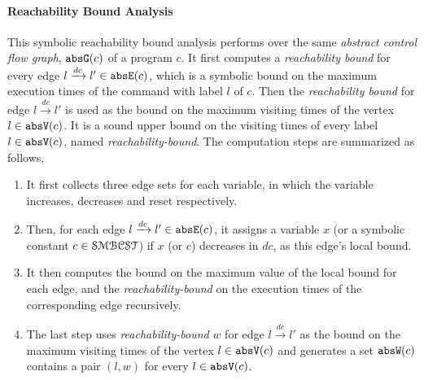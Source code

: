 \paragraph{Reachability Bound Analysis}
This symbolic reachability bound analysis performs over the same \emph{abstract control flow graph}, $\mathtt{abs}{\mathtt{G}}(c)$ of a program $c$. 
It first computes a \emph{reachability bound} for every edge $l \xrightarrow{dc} l' \in \mathtt{abs}{\mathtt{E}}(c)$,
which is a symbolic bound on the maximum execution times of the command with label $l$ of $c$.
Then the \emph{reachability bound} for edge $l \xrightarrow{dc} l'$ is used as the bound on the maximum visiting times of the vertex $l \in \mathtt{abs}{\mathtt{V}}(c)$.
It is a sound upper bound on the visiting times
of every label $l \in \mathtt{abs}{\mathtt{V}}(c)$, named \emph{reachability-bound}.
The computation steps are 
summarized as follows,
\begin{enumerate}
  \item It first collects three edge sets for each variable,
in which the variable increases, decreases and reset respectively.
\item
Then, for each edge  $l \xrightarrow{dc} l' \in \mathtt{abs}{\mathtt{E}}(c)$, it assigns a variable $x$ (or a symbolic constant $c \in \mathcal{SMBCST}$) if $x$ (or $c$) decreases in $dc$, as this edge's local bound.
\item
It then computes the bound on the maximum value of the local bound for each edge,
and the \emph{reachability-bound} on the execution
times of the corresponding edge recursively.
\item The last step uses \emph{reachability-bound} $w$ for edge $l \xrightarrow{dc} l'$ as the bound on the maximum visiting times of the vertex $l \in \mathtt{abs}{\mathtt{V}}(c)$ and generates a set $\mathtt{abs}{\mathtt{W}}(c)$ contains a pair $(l, w)$ for every $l \in \mathtt{abs}{\mathtt{V}}(c)$.
\end{enumerate}

